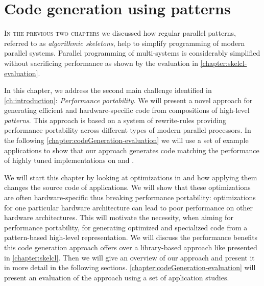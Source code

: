 
\chapter{Code generation using patterns}
%
%
%

\label{ch:fifth} %
\label{chapter:codeGeneration}

\lettrine[lines=3, loversize=0.1]{I}{n the previous two chapters} we discussed how regular parallel patterns, referred to as \emph{algorithmic skeletons}, help to simplify programming of modern parallel systems.
Parallel programming of multi-\GPU systems is considerably simplified without sacrificing performance as shown by the evaluation in \autoref{chapter:skelcl-evaluation}.

In this chapter, we address the second main challenge identified in \autoref{ch:introduction}: \emph{Performance portability}.
We will present a novel approach for generating efficient and hardware-specific code from compositions of high-level \emph{patterns}.
This approach is based on a system of rewrite-rules providing performance portability across different types of modern parallel processors. 
In the following \autoref{chapter:codeGeneration-evaluation} we will use a set of example applications to show that our approach generates code matching the performance of highly tuned implementations on \CPUs and \GPUs.

We will start this chapter by looking at optimizations in \OpenCL and how applying them changes the source code of applications.
We will show that these optimizations are often hardware-specific thus breaking performance portability: optimizations for one particular hardware architecture can lead to poor performance on other hardware architectures.
This will motivate the necessity, when aiming for performance portability, for generating optimized and specialized code from a pattern-based high-level representation.
We will discuss the performance benefits this code generation approach offers over a library-based approach like \SkelCL presented in \autoref{chapter:skelcl}.
Then we will give an overview of our approach and present it in more detail in the following sections.
\autoref{chapter:codeGeneration-evaluation} will present an evaluation of the approach using a set of application studies.

